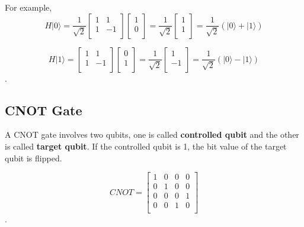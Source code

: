 For example,
\begin{equation}
H|0\rangle = \frac{1}{\sqrt{2}}\begin{bmatrix}
1 & 1\\
1 & -1 \\
\end{bmatrix}\left[
\begin{array}{c}
1 \\
0 \\
\end{array}
\right]
= \frac{1}{\sqrt{2}} \left[
\begin{array}{c}
1 \\
1 \\
\end{array}
\right]
= \frac{1}{\sqrt{2}} (|0\rangle + |1\rangle)
\end{equation}

\begin{equation}
H|1\rangle = \begin{bmatrix}
1 & 1\\
1 & -1 \\
\end{bmatrix} 
\left[
\begin{array}{c}
0 \\
1  \\
\end{array}
\right]
= \frac{1}{\sqrt{2}} \left[
\begin{array}{c}
1 \\
-1 \\
\end{array}
\right]
=\frac{1}{\sqrt{2}} (|0\rangle - |1\rangle)
\end{equation}.

\subsection{CNOT Gate}
A CNOT gate involves two qubits, one is called \textbf{controlled qubit} and the other is called \textbf{target qubit}.  If the controlled qubit is 1, the bit value of the target qubit is flipped.

\begin{equation}
CNOT = \begin{bmatrix}
1 & 0 & 0 & 0 \\
0 & 1 & 0 & 0 \\
0 & 0 & 0 & 1 \\
0 & 0 & 1 & 0 \\
\end{bmatrix}
\end{equation}.

